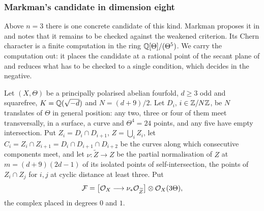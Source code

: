 \subsubsection*{Markman's candidate in dimension eight}

Above $n=3$ there is one concrete candidate of this kind. Markman proposes
it in \cite[Section 12]{Mar25b} and notes that it remains to be checked
against the weakened criterion. Its Chern character is a finite computation
in the ring $\mathbb{Q}[\Theta]/(\Theta^{5})$. We carry the computation out: it
places the candidate at a rational point of the secant plane of
\cite[Definition~14.4]{paperI} and reduces what has to be checked to a single
condition, which  decides in the negative.

\begin{setupenv}\label{setup:markman}
Let $(X,\Theta)$ be a principally polarised abelian fourfold, $d\ge3$ odd and
squarefree, $K=\mathbb{Q}(\sqrt{-d})$ and $N=(d+9)/2$. Let $D_{i}$, $i\in\mathbb{Z}/N\mathbb{Z}$,
be $N$ translates of $\Theta$ in general position: any two, three or four of
them meet transversally, in a surface, a curve and $\Theta^{4}=24$ points,
and any five have empty intersection. Put $Z_{i}=D_{i}\cap D_{i+1}$,
$Z=\bigcup_{i}Z_{i}$, let $C_{i}=Z_{i}\cap Z_{i+1}=D_{i}\cap D_{i+1}\cap D_{i+2}$
be the curves along which consecutive components meet, and let
$\nu\colon\widetilde{Z}\to Z$ be the partial normalisation of $Z$ at
$m=(d+9)(2d-1)$ of its isolated points of self-intersection, the points of
$Z_{i}\cap Z_{j}$ for $i,j$ at cyclic distance at least three. Put
\[
  \mathcal{F}=\bigl[\mathcal{O}_{X}\longrightarrow\nu_{*}\mathcal{O}_{\widetilde{Z}}\bigr]\otimes\mathcal{O}_{X}(3\Theta),
\]
the complex placed in degrees $0$ and $1$.
\end{setupenv}

